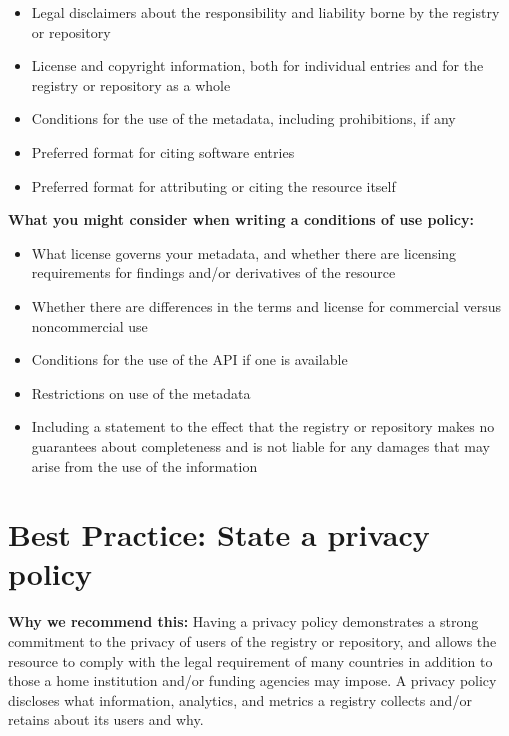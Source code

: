 \documentclass[11pt]{article}
\begin{document}
\begin{itemize}
\item Legal disclaimers about the responsibility and liability borne by the registry or repository

\item License and copyright information, both for individual entries and for the registry or repository as a whole

\item Conditions for the use of the metadata, including prohibitions, if any

\item Preferred format for citing software entries

\item Preferred format for attributing or citing the resource itself

\end{itemize}

\textbf{What you might consider when writing a conditions of use policy:}

\begin{itemize}
\item What license governs your metadata, and whether there are licensing requirements for findings and/or derivatives of the resource

\item Whether there are differences in the terms and license for commercial versus noncommercial use

\item Conditions for the use of the API if one is available 

\item Restrictions on use of the metadata

\item Including a statement to the effect that the registry or repository makes no guarantees about completeness and is not liable for any damages that may arise from the use of the information

\end{itemize}


\section{Best Practice: State a privacy policy}
\label{best-practice-state-a-privacy-policy}

\textbf{Why we recommend this:} Having a privacy policy demonstrates a strong commitment to the privacy of users of the registry or repository, and allows the resource to comply with the legal requirement of many countries in addition to those a home institution and/or funding agencies may impose. A privacy policy discloses what information, analytics, and metrics a registry collects and/or retains about its users and why.
\end{document}
